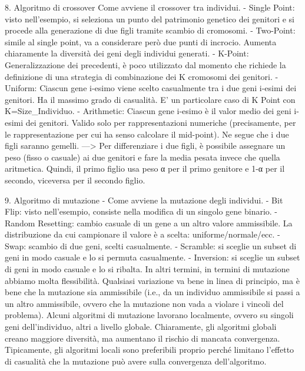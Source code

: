 \documentclass{article}
\begin{document}
    8. Algoritmo di crossover Come avviene il crossover tra individui.
    - Single Point: visto nell’esempio, si seleziona un punto del patrimonio genetico dei genitori e si procede alla generazione di due figli tramite scambio di
    cromosomi.
    - Two-Point: simile al single point, va a considerare però due punti di incrocio. Aumenta chiaramente la diversità dei geni degli individui generati.
    - K-Point: Generalizzazione dei precedenti, è poco utilizzato dal momento che richiede la definizione di una strategia di combinazione dei K cromosomi dei genitori.
    - Uniform: Ciascun gene i-esimo viene scelto casualmente tra i due geni i-esimi dei genitori.
    Ha il massimo grado di casualità. E’ un particolare caso di K Point con K=Size\_Individuo.
    - Arithmetic: Ciascun gene i-esimo è il valor medio dei geni i-esimi dei genitori. Valido solo per rappresentazioni numeriche (precisamente, per le rappresentazione
    per cui ha senso calcolare il mid-point). Ne segue che i due figli saranno gemelli. —> Per differenziare i due figli, è possibile assegnare un peso (fisso o casuale)
    ai due genitori e fare la media pesata invece che quella aritmetica. Quindi, il primo figlio usa peso α per il primo genitore e 1-α per il secondo, viceversa per il
    secondo figlio.


    9. Algoritmo di mutazione - Come avviene la mutazione degli individui.
    - Bit Flip: visto nell’esempio, consiste nella modifica di un singolo gene binario.
    - Random Resetting: cambio casuale di un gene a un altro valore ammissibile. La distribuzione da cui campionare il valore è a scelta: uniforme/normale/ecc.
    - Swap: scambio di due geni, scelti casualmente.
    - Scramble: si sceglie un subset di geni in modo casuale e lo si permuta casualmente.
    - Inversion: si sceglie un subset di geni in modo casuale e lo si ribalta.
    In altri termini, in termini di mutazione abbiamo molta flessibilità. Qualsiasi variazione va bene in linea di principio, ma è bene che la mutazione sia ammissibile
    (i.e., da un individuo ammissibile si passi a un altro ammissibile, ovvero che la mutazione non vada a violare i vincoli del problema).
    Alcuni algoritmi di mutazione lavorano localmente, ovvero su singoli geni dell’individuo, altri a livello globale. Chiaramente, gli algoritmi globali creano
    maggiore diversità, ma aumentano il rischio di mancata convergenza.
    Tipicamente, gli algoritmi locali sono preferibili proprio perché limitano l’effetto di casualità che la mutazione può avere sulla convergenza dell’algoritmo.
\end{document}
